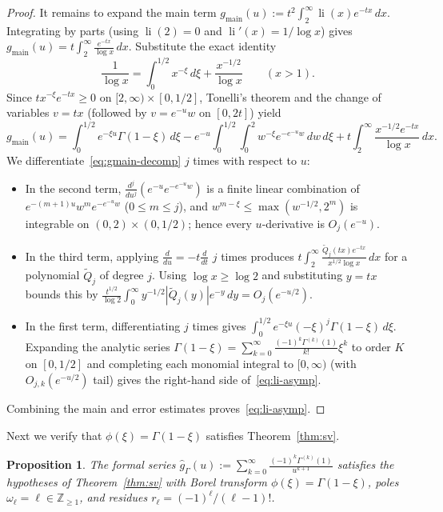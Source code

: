 \documentclass[10pt,reqno]{amsart}
\numberwithin{equation}{section}
\newtheorem{proposition}{Proposition}[section]
\theoremstyle{definition}
\newcommand{\Z}{\mathbb{Z}}
\DeclareMathOperator{\li}{li}
\begin{document}
\begin{proof}
It remains to expand the main term $g_{\mathrm{main}}(u) := t^2 \int_2^\infty \li(x) e^{-tx}\,dx$. Integrating by parts (using $\li(2) = 0$ and $\li'(x) = 1/\log x$) gives $g_{\mathrm{main}}(u) = t \int_2^\infty \frac{e^{-tx}}{\log x}\,dx$. Substitute the exact identity
\[
  \frac{1}{\log x} = \int_0^{1/2} x^{-\xi}\,d\xi + \frac{x^{-1/2}}{\log x} \qquad (x > 1).
\]
Since $t x^{-\xi} e^{-tx} \ge 0$ on $[2,\infty) \times [0, 1/2]$, Tonelli's theorem and the change of variables $v = tx$ (followed by $v = e^{-u} w$ on $[0, 2t]$) yield
\begin{equation}\label{eq:gmain-decomp}
  g_{\mathrm{main}}(u)
  = \int_0^{1/2} e^{-\xi u} \Gamma(1 - \xi)\,d\xi
  - e^{-u} \int_0^{1/2}\!\int_0^2 w^{-\xi} e^{-e^{-u} w}\,dw\,d\xi
  + t \int_2^\infty \frac{x^{-1/2} e^{-tx}}{\log x}\,dx.
\end{equation}
We differentiate~\eqref{eq:gmain-decomp} $j$ times with respect to $u$:
\begin{itemize}
  \item In the second term, $\frac{d^j}{du^j}(e^{-u} e^{-e^{-u} w})$ is a finite linear combination of $e^{-(m+1)u} w^m e^{-e^{-u} w}$ ($0 \le m \le j$), and $w^{m-\xi} \le \max(w^{-1/2}, 2^m)$ is integrable on $(0,2) \times (0, 1/2)$; hence every $u$-derivative is $O_j(e^{-u})$.
  \item In the third term, applying $\frac{d}{du} = -t\frac{d}{dt}$ $j$ times produces $t \int_2^\infty \frac{\widetilde{Q}_j(tx) e^{-tx}}{x^{1/2}\log x}\,dx$ for a polynomial $\widetilde{Q}_j$ of degree $j$. Using $\log x \ge \log 2$ and substituting $y = tx$ bounds this by $\frac{t^{1/2}}{\log 2} \int_0^\infty y^{-1/2} |\widetilde{Q}_j(y)| e^{-y}\,dy = O_j(e^{-u/2})$.
  \item In the first term, differentiating $j$ times gives $\int_0^{1/2} e^{-\xi u}(-\xi)^j \Gamma(1-\xi)\,d\xi$. Expanding the analytic series $\Gamma(1-\xi) = \sum_{k=0}^\infty \frac{(-1)^k \Gamma^{(k)}(1)}{k!}\xi^k$ to order $K$ on $[0, 1/2]$ and completing each monomial integral to $[0, \infty)$ (with $O_{j,k}(e^{-u/2})$ tail) gives the right-hand side of~\eqref{eq:li-asymp}.
\end{itemize}
Combining the main and error estimates proves~\eqref{eq:li-asymp}.
\end{proof}

Next we verify that $\phi(\xi) = \Gamma(1 - \xi)$ satisfies Theorem~\ref{thm:sv}.

\begin{proposition}\label{prop:gamma-sv}
The formal series $\widehat{g}_\Gamma(u) := \sum_{k=0}^\infty \frac{(-1)^k \Gamma^{(k)}(1)}{u^{k+1}}$ satisfies the hypotheses of Theorem~\ref{thm:sv} with Borel transform $\phi(\xi) = \Gamma(1 - \xi)$, poles $\omega_\ell = \ell \in \Z_{\ge 1}$, and residues $r_\ell = (-1)^\ell / (\ell - 1)!$.
\end{proposition}
\end{document}
